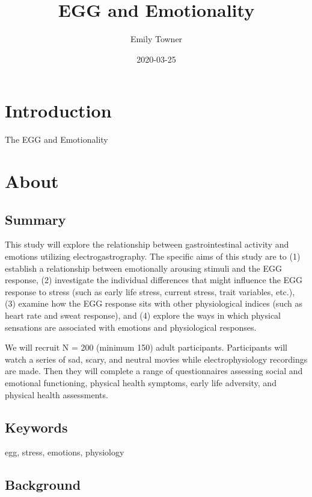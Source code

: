 \documentclass[]{book}
\title{EGG and Emotionality}
\author{Emily Towner}
\date{2020-03-25}
\begin{document}
\maketitle

{
\setcounter{tocdepth}{1}
\tableofcontents
}
\hypertarget{introduction}{%
\chapter{Introduction}\label{introduction}}

The EGG and Emotionality

\hypertarget{about}{%
\chapter{About}\label{about}}

\hypertarget{summary}{%
\section{Summary}\label{summary}}

This study will explore the relationship between gastrointestinal activity and emotions utilizing electrogastrography. The specific aims of this study are to (1) establish a relationship between emotionally arousing stimuli and the EGG response, (2) investigate the individual differences that might influence the EGG response to stress (such as early life stress, current stress, trait variables, etc.), (3) examine how the EGG response sits with other physiological indices (such as heart rate and sweat response), and (4) explore the ways in which physical sensations are associated with emotions and physiological responses.

We will recruit N = 200 (minimum 150) adult participants. Participants will watch a series of sad, scary, and neutral movies while electrophysiology recordings are made. Then they will complete a range of questionnaires assessing social and emotional functioning, physical health symptoms, early life adversity, and physical health assessments.

\hypertarget{keywords}{%
\section{Keywords}\label{keywords}}

egg, stress, emotions, physiology

\hypertarget{background}{%
\section{Background}\label{background}}
\end{document}

